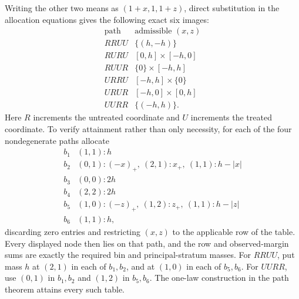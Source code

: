 Writing the other two means as \((1+x,1,1+z)\), direct substitution in the allocation equations gives the following exact six images:
\[
\begin{array}{c|c}
\text{path}&\text{admissible }(x,z)\\ \hline
RRUU&\{(h,-h)\}\\
RURU&[0,h]\times[-h,0]\\
RUUR&\{0\}\times[-h,h]\\
URRU&[-h,h]\times\{0\}\\
URUR&[-h,0]\times[0,h]\\
UURR&\{(-h,h)\}.
\end{array}
\]
Here \(R\) increments the untreated coordinate and \(U\) increments the treated coordinate.  To verify attainment rather than only necessity, for each of the four nondegenerate paths allocate
\[
\begin{array}{c|l}
b_1&(1,1):h\\
b_2&(0,1):(-x)_+,\ (2,1):x_+,\ (1,1):h-|x|\\
b_3&(0,0):2h\\
b_4&(2,2):2h\\
b_5&(1,0):(-z)_+,\ (1,2):z_+,\ (1,1):h-|z|\\
b_6&(1,1):h,
\end{array}
\]
discarding zero entries and restricting \((x,z)\) to the applicable row of the table.  Every displayed node then lies on that path, and the row and observed-margin sums are exactly the required bin and principal-stratum masses.  For \(RRUU\), put mass \(h\) at \((2,1)\) in each of \(b_1,b_2\), and at \((1,0)\) in each of \(b_5,b_6\).  For \(UURR\), use \((0,1)\) in \(b_1,b_2\) and \((1,2)\) in \(b_5,b_6\).  The one-law construction in the path theorem attains every such table.

